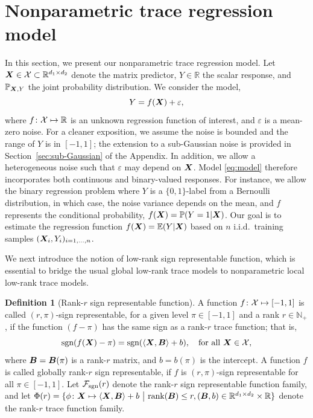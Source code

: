 \documentclass[aos]{imsart}
\theoremstyle{definition}
\newtheorem{definition}{Definition}
\def\sign{\textup{sgn}}
\def\caliF{\tF_{\textup{sgn}}}
\begin{document}
\section{Nonparametric trace regression model}
\label{sec:idea}

In this section, we present our nonparametric trace regression model. Let $\bm X\in\mathcal{X}\subset \mathbb{R}^{d_1\times d_2}$ denote the matrix predictor, $Y\in\mathbb{R}$ the scalar response, and $\mathbb{P}_{\bm X,Y}$ the joint probability distribution. We consider the model,
\begin{equation}\label{eq:model}
Y=f(\mX)+\varepsilon,
\end{equation}
where $f\colon\mathcal{X}\mapsto \mathbb{R}$ is an unknown regression function of interest, and $\varepsilon$ is a mean-zero noise. For a cleaner exposition, we assume the noise is bounded and the range of $Y$ is in $[-1,1]$; the extension to a sub-Gaussian noise is provided in Section~\ref{sec:sub-Gaussian} of the Appendix. In addition, we allow a heterogeneous noise such that $\varepsilon$ may depend on $\bm X$. Model \eqref{eq:model} therefore incorporates both continuous and binary-valued responses. For instance, we allow the binary regression problem where $Y$ is a $\{0,1\}$-label from a Bernoulli distribution, in which case, the noise variance depends on the mean, and $f$ represents the conditional probability, $f(\bm X)=\mathbb{P}(Y=1|\bm X)$. Our goal is to estimate the regression function $f(\bm X)=\mathbb{E}(Y|\bm X)$ based on $n$ i.i.d.\ training samples $(\bm X_i,Y_i)_{i=1,\ldots,n}$. 

We next introduce the notion of low-rank sign representable function, which is essential to bridge the usual global low-rank trace models to nonparametric local low-rank trace models. 

\begin{definition}[Rank-$r$ sign representable function] \label{def:caliF}
A function $f\colon \mathcal{X}\mapsto[-1,1]$ is called $(r,\pi)$-sign representable, for a given level $\pi\in[-1,1]$ and a rank $r \in \mathbb{N}_{+}$, if the function $(f-\pi)$ has the same sign as a rank-$r$ trace function; that is,
\begin{equation} \label{eq:sign}
\sign(f(\mX)-\pi) = \sign(\langle \mX, \mB \rangle+b),\quad \text{for all }\mX\in\tX,
\end{equation}
where $\bm B=\bm B(\pi)$ is a rank-$r$ matrix, and $b=b(\pi)$ is the intercept. A function $f$ is called globally rank-$r$ sign representable, if $f$ is $(r,\pi)$-sign representable for all $\pi\in[-1,1]$. Let $\caliF(r)$ denote the rank-$r$ sign representable function family, and let $\Phi(r)=\{\phi\colon \bm X\mapsto \langle \bm X, \bm B \rangle+b\ \big|\ \text{rank}(\bm B)\leq r, (\bm B,b)\in\mathbb{R}^{d_1\times d_2}\times\mathbb{R}\}$ denote the rank-$r$ trace function family.
\end{definition}
\end{document}
